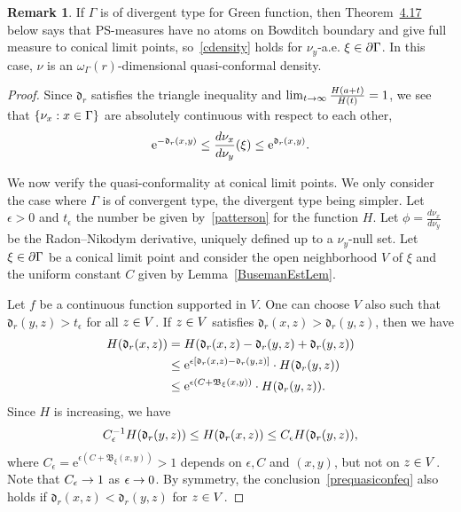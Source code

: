 \documentclass[10pt,a4paper]{amsart}
\newcommand{\pG}{\partial{\Gamma}}
\newcommand{\rme}{\mathrm{e}}
\newcommand{\fkd}{\mathfrak{d}}
\newcommand{\fkB}{\mathfrak{B}}
\let\oldin\in
\renewcommand{\in}{\mathchoice{\oldin}{\oldin}{\,\oldin\,}{\,\oldin\,}}
\let\oldle\le
\renewcommand{\le}{\mathchoice{\oldle}{\oldle}{\,\oldle\,}{\,\oldle\,}}
\renewcommand*{\to}{\mathchoice{\longrightarrow}{\rightarrow}{\rightarrow}{\rightarrow}}
\theoremstyle{definition}\newtheorem{defi}[theo]{Definition}
\newtheorem{rema}[theo]{Remark}
\begin{document}
\begin{rema}
If $\Gamma$ is of divergent type for Green function, then Theorem~\href{https://ahl.centre-mersenne.org/articles/10.5802/ahl.256/}{4.17} below says that PS-measures have no atoms on Bowditch boundary and give full measure to conical limit points, so~\eqref{cdensity} holds for $\nu_y$-a.e. $\xi\in \pG$. In this case, $\nu$ is an $\omega_\Gamma(r)$-dimensional quasi-conformal density.
\end{rema}

\begin{proof}
Since $\fkd_r$ satisfies the triangle inequality and $\lim_{t\to\infty} \frac{H(a+t)}{H(t)}=1$, we see that $\{\nu_x: x\in \Gamma\}$ are absolutely continuous with respect to each other,
\begin{align*}
\rme^{-\fkd_r(x,y)}\le \frac{d\nu_x}{d\nu_y}(\xi) \le \rme^{\fkd_r(x,y)}.
\end{align*}


We now verify the quasi-conformality at conical limit points. We only consider the case where $\Gamma$ is of convergent type, the divergent type being simpler. Let $\epsilon> 0$ and $t_\epsilon$ the number be given by~\eqref{patterson} for the function $H$. Let $\phi=\frac{d\nu_x}{d\nu_y}$ be the Radon--Nikodym derivative, uniquely defined up to a $\nu_y$-null set. Let $\xi \in \pG$ be a conical limit point and consider the open neighborhood $V$ of $\xi$ and the uniform constant $C$ given by Lemma~\ref{BusemanEstLem}.

Let $f$ be a continuous function supported in $V$. One can choose $V$ also such that $\fkd_r(y, z) > t_\epsilon$ for all $z \in V$. If $z \in V$ satisfies $\fkd_r(x, z) >\fkd_r(y, z)$, then we have
\begin{align*}
H(\fkd_r(x,z)) &= H(\fkd_r(x,z)-\fkd_r(y,z)+\fkd_r(y,z)) \\
& \le \rme^{\epsilon[\fkd_r(x,z)-\fkd_r(y,z)]} \cdot H(\fkd_r(y,z)) \\
& \le \rme^{\epsilon (C + \fkB_\xi(x, y))}\cdot H(\fkd_r(y, z)).
\end{align*}
Since $H$ is increasing, we have
\begin{equation}\label{prequasiconfeq}
C_\epsilon^{-1} H(\fkd_r(y, z))\le H(\fkd_r(x, z)) \le C_\epsilon H(\fkd_r(y, z)),
\end{equation}
where $C_\epsilon= \rme^{\epsilon (C + \fkB_\xi(x, y))}>1$ depends on $\epsilon, C$ and $ (x,y)$, but not on $z\in V$. Note that $C_\epsilon\to 1$ as $\epsilon\to 0$. By symmetry, the conclusion~\eqref{prequasiconfeq} also holds if $\fkd_r(x, z) < \fkd_r(y, z)$ for $z \in V$.


\end{proof}
\end{document}

